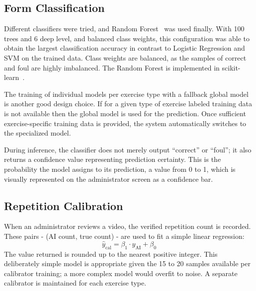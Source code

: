 \documentclass[conference]{IEEEtran}
\begin{document}
\subsection{Form Classification}
Different classifiers were tried, and Random Forest~\cite{breiman2001} was used finally. With 100 trees and 6 deep level, and balanced class weights, this configuration was able to obtain the largest classification accuracy in contrast to Logistic Regression and SVM on the trained data. Class weights are balanced, as the samples of correct and foul are highly imbalanced. The Random Forest is implemented in scikit-learn~\cite{pedregosa2011}.

The training of individual models per exercise type with a fallback global model is another good design choice. If for a given type of exercise labeled training data is not available then the global model is used for the prediction. Once sufficient exercise-specific training data is provided, the system automatically switches to the specialized model.

During inference, the classifier does not merely output ``correct'' or ``foul''; it also returns a confidence value representing prediction certainty. This is the probability the model assigns to its prediction, a value from 0 to 1, which is visually represented on the administrator screen as a confidence bar.

\subsection{Repetition Calibration}
When an administrator reviews a video, the verified repetition count is recorded. These pairs - (AI count, true count) - are used to fit a simple linear regression:
\begin{equation}
\hat{y}_\text{cal} = \beta_1 \cdot y_\text{AI} + \beta_0
\label{eq:repcal}
\end{equation}
The value returned is rounded up to the nearest positive integer. This deliberately simple model is appropriate given the 15 to 20 samples available per calibrator training; a more complex model would overfit to noise. A separate calibrator is maintained for each exercise type.
\end{document}

